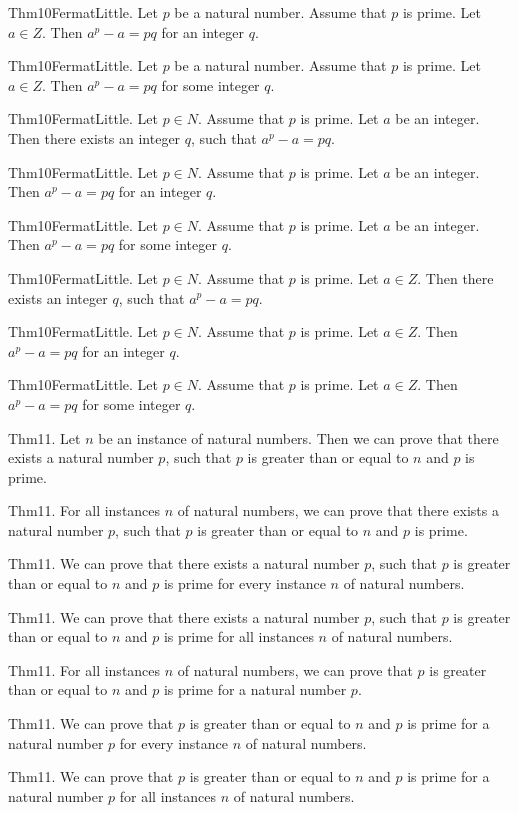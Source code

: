 \documentclass{article}
\begin{document}
Thm10FermatLittle. Let $p$ be a natural number. Assume that $p$ is prime. Let $a \in Z$. Then $a ^ {p}- a = p q$ for an integer $q$.

Thm10FermatLittle. Let $p$ be a natural number. Assume that $p$ is prime. Let $a \in Z$. Then $a ^ {p}- a = p q$ for some integer $q$.

Thm10FermatLittle. Let $p \in N$. Assume that $p$ is prime. Let $a$ be an integer. Then there exists an integer $q$, such that $a ^ {p}- a = p q$.

Thm10FermatLittle. Let $p \in N$. Assume that $p$ is prime. Let $a$ be an integer. Then $a ^ {p}- a = p q$ for an integer $q$.

Thm10FermatLittle. Let $p \in N$. Assume that $p$ is prime. Let $a$ be an integer. Then $a ^ {p}- a = p q$ for some integer $q$.

Thm10FermatLittle. Let $p \in N$. Assume that $p$ is prime. Let $a \in Z$. Then there exists an integer $q$, such that $a ^ {p}- a = p q$.

Thm10FermatLittle. Let $p \in N$. Assume that $p$ is prime. Let $a \in Z$. Then $a ^ {p}- a = p q$ for an integer $q$.

Thm10FermatLittle. Let $p \in N$. Assume that $p$ is prime. Let $a \in Z$. Then $a ^ {p}- a = p q$ for some integer $q$.

Thm11. Let $n$ be an instance of natural numbers. Then we can prove that there exists a natural number $p$, such that $p$ is greater than or equal to $n$ and $p$ is prime.

Thm11. For all instances $n$ of natural numbers, we can prove that there exists a natural number $p$, such that $p$ is greater than or equal to $n$ and $p$ is prime.

Thm11. We can prove that there exists a natural number $p$, such that $p$ is greater than or equal to $n$ and $p$ is prime for every instance $n$ of natural numbers.

Thm11. We can prove that there exists a natural number $p$, such that $p$ is greater than or equal to $n$ and $p$ is prime for all instances $n$ of natural numbers.

Thm11. For all instances $n$ of natural numbers, we can prove that $p$ is greater than or equal to $n$ and $p$ is prime for a natural number $p$.

Thm11. We can prove that $p$ is greater than or equal to $n$ and $p$ is prime for a natural number $p$ for every instance $n$ of natural numbers.

Thm11. We can prove that $p$ is greater than or equal to $n$ and $p$ is prime for a natural number $p$ for all instances $n$ of natural numbers.
\end{document}
